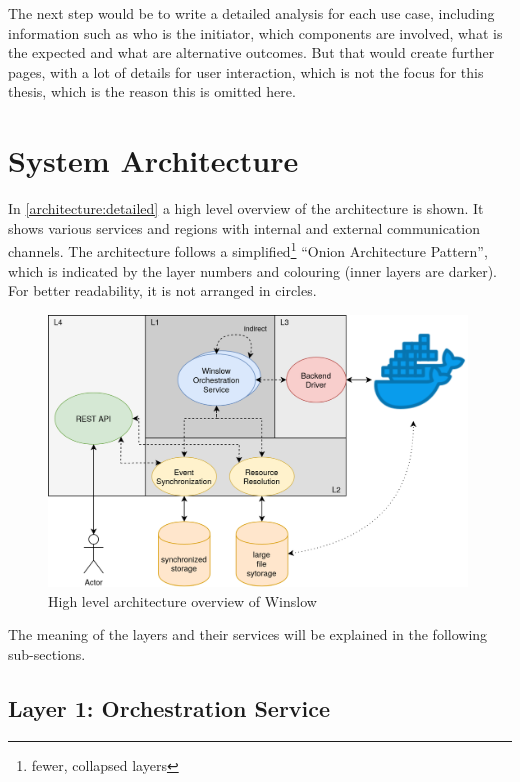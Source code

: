 The next step would be to write a detailed analysis for each use case, including information such as who is the initiator, which components are involved, what is the expected and what are alternative outcomes.
But that would create further pages, with a lot of details for user interaction, which is not the focus for this thesis, which is the reason this is omitted here.

\pagebreak
\section{System Architecture}

In \autoref{architecture:detailed} a high level overview of the architecture is shown.
It shows various services and regions with internal and external communication channels.
The architecture follows a simplified\footnote{fewer, collapsed layers} \enquote{Onion Architecture Pattern}\cite{palermo:onion}, which is indicated by the layer numbers and colouring (inner layers are darker).
For better readability, it is not arranged in circles.



\begin{figure}[H]
	\includegraphics[width=0.99\textwidth]{architecture_detailed.png}
	\centering
	\caption{High level architecture overview of Winslow}
	\label{architecture:detailed}
\end{figure}

The meaning of the layers and their services will be explained in the following sub-sections.

\subsection{Layer 1: Orchestration Service}
\label{analysis:layer_1}

